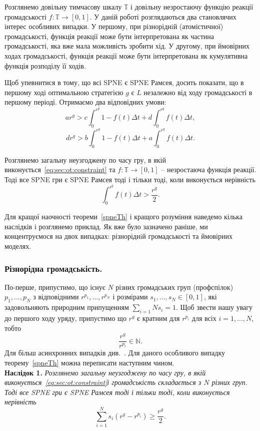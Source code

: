 Розглянемо довільну тимчасову шкалу $\mathbb{T}$ і довільну незростаючу функцію реакції громадськості $f : \mathbb{T} \to [0,1]$. У даній роботі розглядаються два становлячих інтерес особливих випадки. У першому, при різноріднiй (атомістичної) громадськості, функція реакції може бути інтерпретована як частина громадськості, яка вже мала можливість зробити хід. У другому, при ймовірних ходах громадськості, функція реакції може бути інтерпретована як кумулятивна функція розподілу її ходів.

Щоб упевнитися в тому, що всі SPNE є SPNE Рамсея, досить показати, що в першому ході оптимальною стратегією $g$ є $L$ незалежно від ходу громадськості в першому періоді. Отримаємо два відповідних умови:
\begin{equation}
\label{sec:hetero:main1}
ar^g > c \int_0^{r^g} 1 - f(t) \Delta t + d  \int_0^{r^g} f(t) \Delta t ,
\end{equation}
\begin{equation}
\label{sec:hetero:main2}
dr^g > b \int_0^{r^g} 1 - f(t) \Delta t + a  \int_0^{r^g} f(t) \Delta t .
\end{equation}

\begin{theorem}
	\label{spneTh}
Розглянемо загальну неузгоджену по часу гру, в якій виконується~\eqref{eq:sec:ot:constraint} та $f : \mathbb{T} \to [0,1]$ -- незростаюча функція реакції. Тоді все SPNE гри є SPNE Рамсея тоді і тільки тоді, коли виконується нерівність
	\begin{equation}
	\label{sec:hetero:main3}
	\int_0^{r^g} f(t) \Delta t > \frac{r^g}{2} .
	\end{equation}
\end{theorem}

Для кращої наочності теореми~\ref{spneTh} і кращого розуміння наведемо кілька наслідків і розглянемо приклад. Як вже було зазначено раніше, ми концентруємося на двох випадках: різноріднiй громадськості та ймовірних моделях.

\subsubsection{Різнорідна громадськість.} По-перше, припустимо, що існує $ N $ різних громадських груп (профспілок) $p_1,...,p_N$ з відповідними  $r^{p_1},...,r^{p_N}$ і розмірами $s_1,...,s_N \in [0,1]$, які задовольняють природним припущенням  $\sum_{i=1}{N}s_i = 1$. Щоб звести нашу увагу до першого ходу уряду, припустимо що $r^g$ є кратним для $r^{p_i}$ для всіх $i = 1,...,N$, тобто
$$ \frac{r^g}{r^{p_i}} \in \mathbb{N}.$$
Для більш асинхронних випадків див.~\cite{libichIncorpo}. Для даного особливого випадку теорему~\ref{spneTh} можна переписати наступним чином.\\
\textbf{Наслідок 1.} \textit{Розглянемо загальну неузгоджену по часу гру, в якій виконується~\eqref{eq:sec:ot:constraint}і громадськість складається з $ N $ різних груп. Тоді все SPNE гри є SPNE Рамсея тоді і тільки тоді, коли виконується нерівність
	\begin{equation}
	\label{sec:hetero:main4}
	\sum_{i=1}^N s_i(r^g - r^{p_i}) \geqslant \frac{r^g}{2} .
	\end{equation}
}

